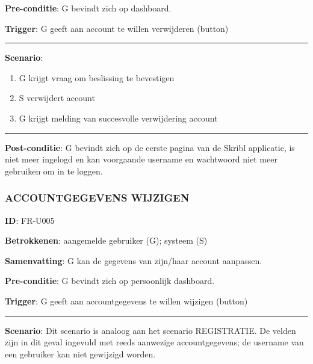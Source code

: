 \noindent \textbf{Pre-conditie}: G bevindt zich op dashboard.
\vspace{2 mm}

\noindent \textbf{Trigger}: G geeft aan account te willen verwijderen (button)

\vspace{4 mm}
\hrule
\vspace{2 mm}
\noindent \textbf{Scenario}:
\begin{enumerate}
  \item G krijgt vraag om beslissing te bevestigen 
  \item S verwijdert account 
  \item G krijgt melding van succesvolle verwijdering account
\end{enumerate}


\vspace{2 mm}
\hrule
\vspace{4 mm}

\noindent \textbf{Post-conditie}: G bevindt zich op de eerste pagina van de Skribl applicatie, is niet meer ingelogd en kan voorgaande username en wachtwoord niet meer gebruiken om in te loggen. \\



\subsubsection{ACCOUNTGEGEVENS WIJZIGEN}
\vspace{2 mm}

\textbf{ID}: FR-U005
\vspace{2 mm}

\noindent \textbf{Betrokkenen}: aangemelde gebruiker (G); systeem (S) 
\vspace{2 mm}

\noindent \textbf{Samenvatting}: G kan de gegevens van zijn/haar account aanpassen. 
\vspace{2 mm}

\noindent \textbf{Pre-conditie}: G bevindt zich op persoonlijk dashboard.
\vspace{2 mm}

\noindent \textbf{Trigger}: G geeft aan accountgegevens te willen wijzigen (button)

\vspace{4 mm}
\hrule
\vspace{2 mm}
\noindent \textbf{Scenario}:
\noindent Dit scenario is analoog aan het scenario REGISTRATIE. De velden zijn in dit geval ingevuld met reeds aanwezige accountgegevens; de username van een gebruiker kan niet gewijzigd worden. 

